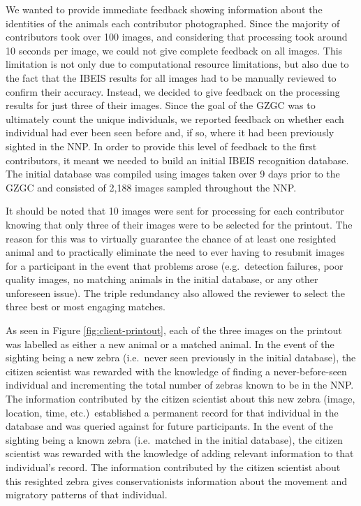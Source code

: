 We wanted to provide immediate feedback showing information about the identities of the animals each contributor photographed.  Since the majority of contributors took over 100 images, and considering that processing took around 10 seconds per image, we could not give complete feedback on all images.  This limitation is not only due to computational resource limitations, but also due to the fact that the IBEIS results for all images had to be manually reviewed to confirm their accuracy.  Instead, we decided to give feedback on the processing results for just three of their images.  Since the goal of the GZGC was to ultimately count the unique individuals, we reported feedback on whether each individual had ever been seen before and, if so, where it had been previously sighted in the NNP.  In order to provide this level of feedback to the first contributors, it meant we needed to build an initial IBEIS recognition database.  The initial database was compiled using images taken over 9 days prior to the GZGC and consisted of 2,188 images sampled throughout the NNP.

It should be noted that 10 images were sent for processing for each contributor knowing that only three of their images were to be selected for the printout.  The reason for this was to virtually guarantee the chance of at least one resighted animal and to practically eliminate the need to ever having to resubmit images for a participant in the event that problems arose (e.g.\ detection failures, poor quality images, no matching animals in the initial database, or any other unforeseen issue).  The triple redundancy also allowed the reviewer to select the three best or most engaging matches.  

As seen in Figure \ref{fig:client-printout}, each of the three images on the printout was labelled as either a new animal or a matched animal.  In the event of the sighting being a new zebra (i.e.\ never seen previously in the initial database), the citizen scientist was rewarded with the knowledge of finding a never-before-seen individual and incrementing the total number of zebras known to be in the NNP.  The information contributed by the citizen scientist about this new zebra (image, location, time, etc.)\ established a permanent record for that individual in the database and was queried against for future participants.  In the event of the sighting being a known zebra (i.e.\ matched in the initial database), the citizen scientist was rewarded with the knowledge of adding relevant information to that individual's record.  The information contributed by the citizen scientist about this resighted zebra gives conservationists information about the movement and migratory patterns of that individual. 

